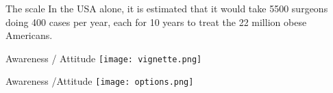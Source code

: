 \documentclass[11pt]{beamer}
\begin{document}
{
\begin{frame}[plain]
\end{frame}
}
\begin{frame}{The scale}
In the USA alone, it is estimated that it would take 5500 surgeons doing 400 cases per year, each for 10 years to treat the 22 million obese Americans.
\end{frame} 
\begin{frame}{Awareness / Attitude }
\texttt{[image: vignette.png]}
\end{frame} 
\begin{frame}{ Awareness /Attitude }
\texttt{[image: options.png]}
\end{frame} 
\end{document}

